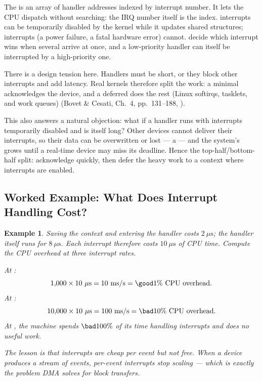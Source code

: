 \documentclass[11pt]{article}
\newtheorem{example}{Example}
\begin{document}
The  is an array of handler addresses indexed by interrupt number. It lets the CPU dispatch without searching: the IRQ number itself is the index.  interrupts can be temporarily disabled by the kernel while it updates shared structures;  interrupts (a power failure, a fatal hardware error) cannot.  decide which interrupt wins when several arrive at once, and a low-priority handler can itself be interrupted by a high-priority one.

There is a design tension here. Handlers must be short, or they block other interrupts and add latency. Real kernels therefore split the work: a minimal  acknowledges the device, and a deferred  does the rest (Linux softirqs, tasklets, and work queues) (Bovet \& Cesati, Ch.~4, pp.~131--188, \cite{BovetCesati_understanding_linux_kernel}).

This also answers a natural objection: what if a handler runs with interrupts temporarily disabled and is itself long? Other devices cannot deliver their interrupts, so their data can be overwritten or lost --- a  --- and the system's  grows until a real-time device may miss its deadline. Hence the top-half/bottom-half split: acknowledge quickly, then defer the heavy work to a context where interrupts are enabled.

\subsection{Worked Example: What Does Interrupt Handling Cost?}

\begin{example}
Saving the context and entering the handler costs $2\ \mu\text{s}$; the handler itself runs for $8\ \mu\text{s}$. Each interrupt therefore costs $10\ \mu\text{s}$ of CPU time. Compute the CPU overhead at three interrupt rates.

At :
\[
1{,}000 \times 10\ \mu\text{s} = 10\ \text{ms/s} = \good{1\%}\ \text{CPU overhead}.
\]
At :
\[
10{,}000 \times 10\ \mu\text{s} = 100\ \text{ms/s} = \bad{10\%}\ \text{CPU overhead}.
\]
At , the machine spends $\bad{100\%}$ of its time handling interrupts and does no useful work.

The lesson is that interrupts are cheap per event but not free. When a device produces a \emph{stream} of events, per-event interrupts stop scaling --- which is exactly the problem DMA solves for block transfers.
\end{example}
\end{document}
